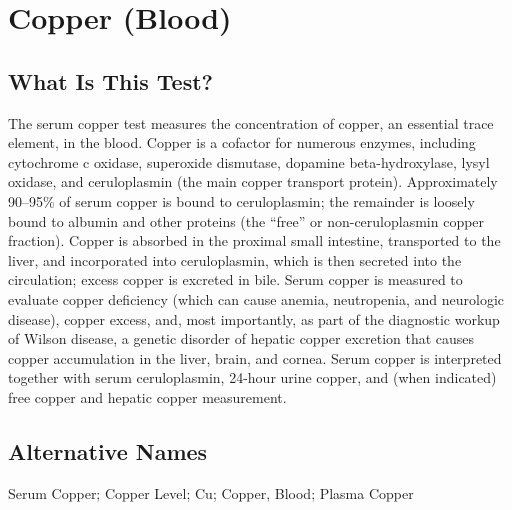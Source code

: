 \chapter{Copper (Blood)}

\section*{What Is This Test?}
The serum copper test measures the concentration of copper, an essential trace element, in the blood. Copper is a cofactor for numerous enzymes, including cytochrome c oxidase, superoxide dismutase, dopamine beta-hydroxylase, lysyl oxidase, and ceruloplasmin (the main copper transport protein). Approximately 90--95\% of serum copper is bound to ceruloplasmin; the remainder is loosely bound to albumin and other proteins (the ``free'' or non-ceruloplasmin copper fraction). Copper is absorbed in the proximal small intestine, transported to the liver, and incorporated into ceruloplasmin, which is then secreted into the circulation; excess copper is excreted in bile. Serum copper is measured to evaluate copper deficiency (which can cause anemia, neutropenia, and neurologic disease), copper excess, and, most importantly, as part of the diagnostic workup of Wilson disease, a genetic disorder of hepatic copper excretion that causes copper accumulation in the liver, brain, and cornea. Serum copper is interpreted together with serum ceruloplasmin, 24-hour urine copper, and (when indicated) free copper and hepatic copper measurement.

\section*{Alternative Names}
Serum Copper; Copper Level; Cu; Copper, Blood; Plasma Copper

